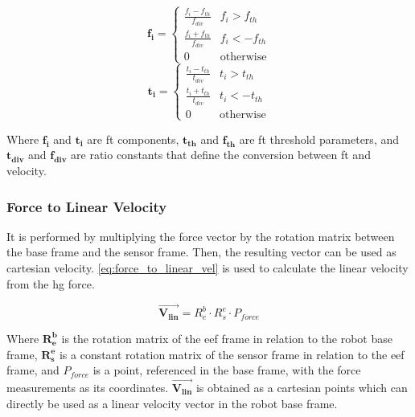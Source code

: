 \begin{multicols}{2}
    \begin{equation}
        \mathbf{f_i} =
        \begin{cases}
          \frac{f_i - f_{th}}{f_{div}} & f_i > f_{th}\\
          \frac{f_i + f_{th}}{f_{div}} & f_i < -f_{th}\\
          0 & \text{otherwise}
        \end{cases}
        \label{eq:f_thresh}
    \end{equation}\break
    \begin{equation}
        \mathbf{t_i} =
        \begin{cases}
          \frac{t_i - t_{th}}{t_{div}} & t_i > t_{th}\\
          \frac{t_i + t_{th}}{t_{div}} & t_i < -t_{th}\\
          0 & \text{otherwise}
        \end{cases}
        \label{eq:t_thresh} 
    \end{equation}
\end{multicols}

\noindent Where $\mathbf{f_i}$ and $\mathbf{t_i}$ are \ac{ft} components, $\mathbf{t_{th}}$ and $\mathbf{f_{th}}$ are \ac{ft} threshold parameters, and $\mathbf{t_{div}}$ and $\mathbf{f_{div}}$ are ratio constants that define the conversion between \ac{ft} and velocity.

\subsubsection{Force to Linear Velocity}


\par It is performed by multiplying the force vector by the rotation matrix between the base frame and the sensor frame. Then, the resulting vector can be used as cartesian velocity. \autoref{eq:force_to_linear_vel} is used to calculate the linear velocity from the \ac{hg} force.

\begin{equation}
    \vec{\mathbf{V_{lin}}} = R^b_e \cdot R^e_s \cdot P_{force}
    \label{eq:force_to_linear_vel}
\end{equation}

\noindent Where $\mathbf{R^b_e}$ is the rotation matrix of the \ac{eef} frame in relation to the robot base frame, $\mathbf{R^e_s}$ is a constant rotation matrix of the sensor frame in relation to the \ac{eef} frame, and $P_{force}$ is a point, referenced in the base frame, with the force measurements as its coordinates. $\vec{\mathbf{V_{lin}}}$ is obtained as a cartesian points which can directly be used as a linear velocity vector in the robot base frame.

